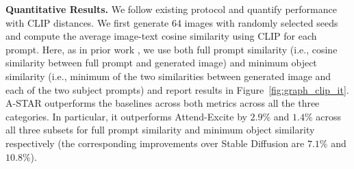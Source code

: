 \documentclass[10pt,twocolumn,letterpaper]{article}
\begin{document}
\begin{table}[]
    \vspace{-8pt}
    \caption{Ablation results for text-text similarities.}
    \vspace{-10pt}
    \label{tab:abl_text_text}
\end{table}




\textbf{Quantitative Results.} We follow existing protocol \cite{chefer2023attend} and quantify performance with CLIP \cite{radford2021learning} distances. We first generate 64 images with randomly selected seeds and compute the  average image-text  cosine similarity using CLIP for each prompt. Here, as in prior work \cite{chefer2023attend}, we use both full prompt similarity (i.e., cosine similarity between full prompt and generated image) and minimum object similarity (i.e., minimum of the two similarities between generated image and each of the two subject prompts) and report results in Figure~\ref{fig:graph_clip_it}. A-STAR outperforms the baselines across both metrics across all the three categories. In particular, it outperforms Attend-Excite \cite{chefer2023attend} by $2.9\%$ and $1.4\%$ across all three subsets for full prompt similarity and minimum object similarity respectively (the corresponding improvements over Stable Diffusion \cite{rombach2022high} are $7.1\%$ and $10.8\%$).
\end{document}
